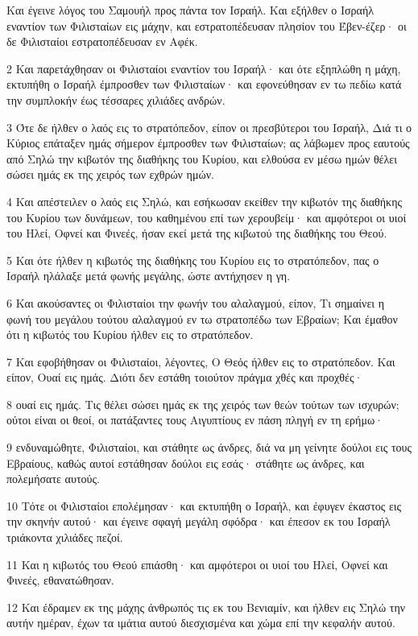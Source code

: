 \par Και έγεινε λόγος του Σαμουήλ προς πάντα τον Ισραήλ. Και εξήλθεν ο Ισραήλ εναντίον των Φιλισταίων εις μάχην, και εστρατοπέδευσαν πλησίον του Έβεν-έζερ· οι δε Φιλισταίοι εστρατοπέδευσαν εν Αφέκ.
\par 2 Και παρετάχθησαν οι Φιλισταίοι εναντίον του Ισραήλ· και ότε εξηπλώθη η μάχη, εκτυπήθη ο Ισραήλ έμπροσθεν των Φιλισταίων· και εφονεύθησαν εν τω πεδίω κατά την συμπλοκήν έως τέσσαρες χιλιάδες ανδρών.
\par 3 Ότε δε ήλθεν ο λαός εις το στρατόπεδον, είπον οι πρεσβύτεροι του Ισραήλ, Διά τι ο Κύριος επάταξεν ημάς σήμερον έμπροσθεν των Φιλισταίων; ας λάβωμεν προς εαυτούς από Σηλώ την κιβωτόν της διαθήκης του Κυρίου, και ελθούσα εν μέσω ημών θέλει σώσει ημάς εκ της χειρός των εχθρών ημών.
\par 4 Και απέστειλεν ο λαός εις Σηλώ, και εσήκωσαν εκείθεν την κιβωτόν της διαθήκης του Κυρίου των δυνάμεων, του καθημένου επί των χερουβείμ· και αμφότεροι οι υιοί του Ηλεί, Οφνεί και Φινεές, ήσαν εκεί μετά της κιβωτού της διαθήκης του Θεού.
\par 5 Και ότε ήλθεν η κιβωτός της διαθήκης του Κυρίου εις το στρατόπεδον, πας ο Ισραήλ ηλάλαξε μετά φωνής μεγάλης, ώστε αντήχησεν η γη.
\par 6 Και ακούσαντες οι Φιλισταίοι την φωνήν του αλαλαγμού, είπον, Τι σημαίνει η φωνή του μεγάλου τούτου αλαλαγμού εν τω στρατοπέδω των Εβραίων; Και έμαθον ότι η κιβωτός του Κυρίου ήλθεν εις το στρατόπεδον.
\par 7 Και εφοβήθησαν οι Φιλισταίοι, λέγοντες, Ο Θεός ήλθεν εις το στρατόπεδον. Και είπον, Ουαί εις ημάς. Διότι δεν εστάθη τοιούτον πράγμα χθές και προχθές·
\par 8 ουαί εις ημάς. Τις θέλει σώσει ημάς εκ της χειρός των θεών τούτων των ισχυρών; ούτοι είναι οι θεοί, οι πατάξαντες τους Αιγυπτίους εν πάση πληγή εν τη ερήμω·
\par 9 ενδυναμώθητε, Φιλισταίοι, και στάθητε ως άνδρες, διά να μη γείνητε δούλοι εις τους Εβραίους, καθώς αυτοί εστάθησαν δούλοι εις εσάς· στάθητε ως άνδρες, και πολεμήσατε αυτούς.
\par 10 Τότε οι Φιλισταίοι επολέμησαν· και εκτυπήθη ο Ισραήλ, και έφυγεν έκαστος εις την σκηνήν αυτού· και έγεινε σφαγή μεγάλη σφόδρα· και έπεσον εκ του Ισραήλ τριάκοντα χιλιάδες πεζοί.
\par 11 Και η κιβωτός του Θεού επιάσθη· και αμφότεροι οι υιοί του Ηλεί, Οφνεί και Φινεές, εθανατώθησαν.
\par 12 Και έδραμεν εκ της μάχης άνθρωπός τις εκ του Βενιαμίν, και ήλθεν εις Σηλώ την αυτήν ημέραν, έχων τα ιμάτια αυτού διεσχισμένα και χώμα επί την κεφαλήν αυτού.
